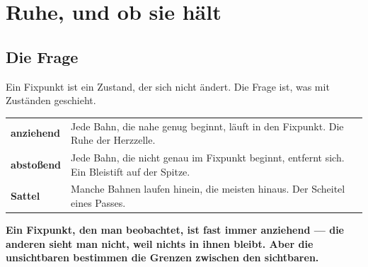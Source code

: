 \chapter{Ruhe, und ob sie hält}

\section{Die Frage}

\begin{merksatz}
Ein Fixpunkt ist ein Zustand, der sich nicht ändert. Die Frage ist, was mit Zuständen  geschieht.

\begin{center}
{\small
\renewcommand{\arraystretch}{1.5}
\begin{tabular}{@{}P{2.8cm}P{6.0cm}@{}}
\toprule
\textbf{anziehend} & Jede Bahn, die nahe genug beginnt, läuft in den Fixpunkt. Die Ruhe der Herzzelle.\\
\textbf{abstoßend} & Jede Bahn, die nicht genau im Fixpunkt beginnt, entfernt sich. Ein Bleistift auf der Spitze.\\
\textbf{Sattel} & Manche Bahnen laufen hinein, die meisten hinaus. Der Scheitel eines Passes.\\
\bottomrule
\end{tabular}}
\end{center}

\begin{center}
\begin{minipage}{0.9\textwidth}
\textbf{Ein Fixpunkt, den man beobachtet, ist fast immer anziehend --- die anderen sieht man nicht, weil nichts in ihnen bleibt. Aber die unsichtbaren bestimmen die Grenzen zwischen den sichtbaren.}
\end{minipage}
\end{center}

\begin{center}
\begin{minipage}{0.88\textwidth}
\end{minipage}
\end{center}
\end{merksatz}


